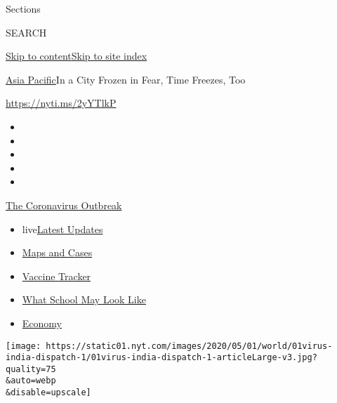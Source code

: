 Sections

SEARCH

\protect\hyperlink{site-content}{Skip to
content}\protect\hyperlink{site-index}{Skip to site index}

\href{/section/world/asia}{Asia Pacific}\textbar{}In a City Frozen in
Fear, Time Freezes, Too

\url{https://nyti.ms/2yYTlkP}

\begin{itemize}
\item
\item
\item
\item
\item
\end{itemize}

\href{https://www.nytimes.com/news-event/coronavirus?action=click\&pgtype=Article\&state=default\&region=TOP_BANNER\&context=storylines_menu}{The
Coronavirus Outbreak}

\begin{itemize}
\tightlist
\item
  live\href{https://www.nytimes.com/2020/08/02/world/coronavirus-updates.html?action=click\&pgtype=Article\&state=default\&region=TOP_BANNER\&context=storylines_menu}{Latest
  Updates}
\item
  \href{https://www.nytimes.com/interactive/2020/us/coronavirus-us-cases.html?action=click\&pgtype=Article\&state=default\&region=TOP_BANNER\&context=storylines_menu}{Maps
  and Cases}
\item
  \href{https://www.nytimes.com/interactive/2020/science/coronavirus-vaccine-tracker.html?action=click\&pgtype=Article\&state=default\&region=TOP_BANNER\&context=storylines_menu}{Vaccine
  Tracker}
\item
  \href{https://www.nytimes.com/interactive/2020/07/29/us/schools-reopening-coronavirus.html?action=click\&pgtype=Article\&state=default\&region=TOP_BANNER\&context=storylines_menu}{What
  School May Look Like}
\item
  \href{https://www.nytimes.com/live/2020/07/31/business/stock-market-today-coronavirus?action=click\&pgtype=Article\&state=default\&region=TOP_BANNER\&context=storylines_menu}{Economy}
\end{itemize}

\texttt{[image: https://static01.nyt.com/images/2020/05/01/world/01virus-india-dispatch-1/01virus-india-dispatch-1-articleLarge-v3.jpg?quality=75\\\&auto=webp\\\&disable=upscale]}

